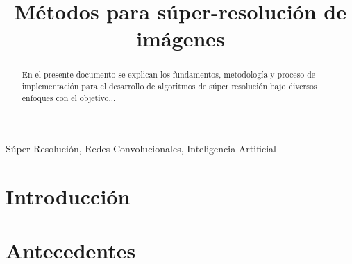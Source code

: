 \documentclass[journal, onecolumn]{IEEEtran}
\numberwithin{equation}{section}
\numberwithin{figure}{section}
\numberwithin{table}{section}
\begin{document}
    \renewcommand{\tablename}{Tabla}
    \title{Métodos para súper-resolución de imágenes}
    
    \author{
    }

    \maketitle

    \begin{abstract}
        En el presente documento se explican los fundamentos, metodología y proceso de implementación 
        para el desarrollo de algoritmos de súper resolución bajo diversos enfoques con el objetivo... 
    \end{abstract}

    \begin{IEEEkeywords}
    Súper Resolución, Redes Convolucionales, Inteligencia Artificial
    \end{IEEEkeywords}

    \section{Introducción}

    


    
    

    \section{Antecedentes}
    
    
    
    
    
\end{document}
